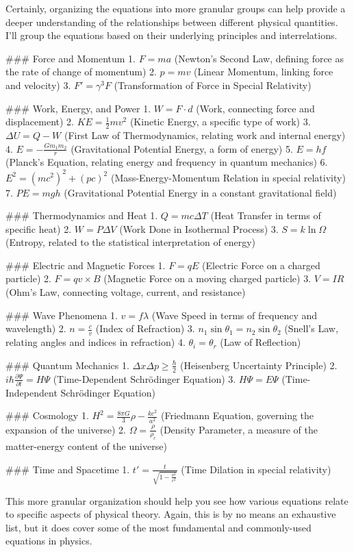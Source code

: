 Certainly, organizing the equations into more granular groups can help provide a deeper understanding of the relationships between different physical quantities. I'll group the equations based on their underlying principles and interrelations.

### Force and Momentum
1. \( F = ma \) (Newton's Second Law, defining force as the rate of change of momentum)
2. \( p = mv \) (Linear Momentum, linking force and velocity)
3. \( F' = \gamma^3 F \) (Transformation of Force in Special Relativity)

### Work, Energy, and Power
1. \( W = F \cdot d \) (Work, connecting force and displacement)
2. \( KE = \frac{1}{2}mv^2 \) (Kinetic Energy, a specific type of work)
3. \( \Delta U = Q - W \) (First Law of Thermodynamics, relating work and internal energy)
4. \( E = -\frac{Gm_1m_2}{r} \) (Gravitational Potential Energy, a form of energy)
5. \( E = hf \) (Planck's Equation, relating energy and frequency in quantum mechanics)
6. \( E^2 = (mc^2)^2 + (pc)^2 \) (Mass-Energy-Momentum Relation in special relativity)
7. \( PE = mgh \) (Gravitational Potential Energy in a constant gravitational field)
  
### Thermodynamics and Heat
1. \( Q = mc\Delta T \) (Heat Transfer in terms of specific heat)
2. \( W = P\Delta V \) (Work Done in Isothermal Process)
3. \( S = k \ln \Omega \) (Entropy, related to the statistical interpretation of energy)

### Electric and Magnetic Forces
1. \( F = qE \) (Electric Force on a charged particle)
2. \( F = qv \times B \) (Magnetic Force on a moving charged particle)
3. \( V = IR \) (Ohm's Law, connecting voltage, current, and resistance)

### Wave Phenomena
1. \( v = f\lambda \) (Wave Speed in terms of frequency and wavelength)
2. \( n = \frac{c}{v} \) (Index of Refraction)
3. \( n_1 \sin \theta_1 = n_2 \sin \theta_2 \) (Snell's Law, relating angles and indices in refraction)
4. \( \theta_i = \theta_r \) (Law of Reflection)

### Quantum Mechanics
1. \( \Delta x \Delta p \geq \frac{\hbar}{2} \) (Heisenberg Uncertainty Principle)
2. \( i\hbar \frac{\partial \Psi}{\partial t} = H \Psi \) (Time-Dependent Schrödinger Equation)
3. \( H \Psi = E \Psi \) (Time-Independent Schrödinger Equation)

### Cosmology
1. \( H^2 = \frac{8\pi G}{3}\rho - \frac{kc^2}{a^2} \) (Friedmann Equation, governing the expansion of the universe)
2. \( \Omega = \frac{\rho}{\rho_c} \) (Density Parameter, a measure of the matter-energy content of the universe)

### Time and Spacetime
1. \( t' = \frac{t}{\sqrt{1-\frac{v^2}{c^2}}} \) (Time Dilation in special relativity)

This more granular organization should help you see how various equations relate to specific aspects of physical theory. Again, this is by no means an exhaustive list, but it does cover some of the most fundamental and commonly-used equations in physics.
